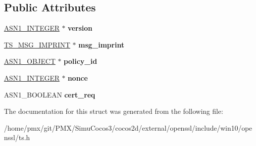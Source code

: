 \subsection*{Public Attributes}
\begin{DoxyCompactItemize}
\item 
\mbox{\label{structTS__req__st_aa404dd344baaf8d45b951fb6818e0ea6}} 
\hyperlink{structasn1__string__st}{A\+S\+N1\+\_\+\+I\+N\+T\+E\+G\+ER} $\ast$ {\bfseries version}
\item 
\mbox{\label{structTS__req__st_a67ac68f0ed40b4230451fecd2e792697}} 
\hyperlink{structTS__msg__imprint__st}{T\+S\+\_\+\+M\+S\+G\+\_\+\+I\+M\+P\+R\+I\+NT} $\ast$ {\bfseries msg\+\_\+imprint}
\item 
\mbox{\label{structTS__req__st_a11bdc5b6a551d6e36046fbac834ffc83}} 
\hyperlink{structasn1__object__st}{A\+S\+N1\+\_\+\+O\+B\+J\+E\+CT} $\ast$ {\bfseries policy\+\_\+id}
\item 
\mbox{\label{structTS__req__st_ad18dbde081c6d4caf09b5a6bce093221}} 
\hyperlink{structasn1__string__st}{A\+S\+N1\+\_\+\+I\+N\+T\+E\+G\+ER} $\ast$ {\bfseries nonce}
\item 
\mbox{\label{structTS__req__st_a9be51acb28db78bc8584e5a51e03be59}} 
A\+S\+N1\+\_\+\+B\+O\+O\+L\+E\+AN {\bfseries cert\+\_\+req}
\end{DoxyCompactItemize}


The documentation for this struct was generated from the following file\+:\begin{DoxyCompactItemize}
\item 
/home/pmx/git/\+P\+M\+X/\+Simu\+Cocos3/cocos2d/external/openssl/include/win10/openssl/ts.\+h\end{DoxyCompactItemize}
